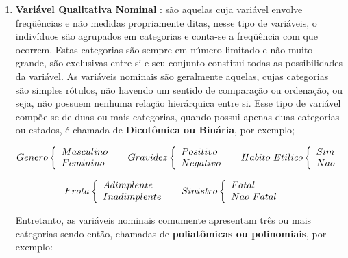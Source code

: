 \begin{enumerate}
\item \textbf{Variável Qualitativa Nominal} : são aquelas cuja variável envolve fre\-qüên\-cias e não medidas propriamente ditas, nesse tipo de variáveis, o indivíduos são agrupados em categorias e conta-se a freqüência com que ocorrem. Estas categorias são sempre em número limitado e não muito grande, são exclusivas entre si e seu conjunto constitui todas as possibilidades da variável. As variáveis nominais são geralmente aquelas, cujas categorias são simples rótulos, não havendo um sentido de comparação ou ordenação, ou seja, não possuem nenhuma relação hierárquica entre si. Esse tipo de variável compõe-se de duas ou mais categorias, quando possui apenas duas categorias ou estados, é chamada de \textbf{Dicotômica ou Binária}, por exemplo;

$$
    Genero
    \left\{
    \begin{array}{ll}
    Masculino & \hbox{ } \\
    Feminino & \hbox{ }
    \end{array}
    \right.
  Gravidez
    \left\{
    \begin{array}{ll}
    Positivo & \hbox{ } \\
    Negativo & \hbox{ }
    \end{array}
    \right.
    Habito \ Etilico
    \left\{
    \begin{array}{ll}
    Sim & \hbox{ } \\
    Nao & \hbox{ }
    \end{array}
    \right.
    $$

    $$
    Frota
    \left\{
    \begin{array}{ll}
    Adimplente    & \hbox{ } \\
    Inadimplente  & \hbox{ }
    \end{array}
    \right.
     Sinistro
    \left\{
    \begin{array}{ll}
    Fatal     & \hbox{ } \\
    Nao \ Fatal & \hbox{ }
    \end{array}
    \right.
    $$
    
\newpage
Entretanto, as variáveis nominais comumente apresentam três ou mais categorias sendo então, chamadas de \textbf{poliatômicas ou polinomiais}, por exemplo:


\end{enumerate}
